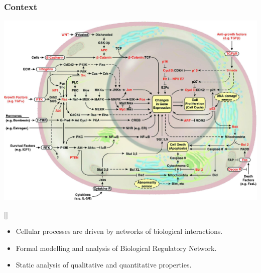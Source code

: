 \begin{frame}[c]
  \frametitle{Context}
\begin{center}
  \includegraphics[scale=0.12]{images/cellule-description.jpeg}
\end{center}
\begin{center}
{\tiny \color{darkgreen}[\citelui]}
\end{center}


\begin{itemize}
\item Cellular processes are driven by networks of biological interactions.
\item Formal modelling and analysis of Biological Regulatory Network.
\item Static analysis of qualitative and quantitative properties.
\end{itemize}







\end{frame}


